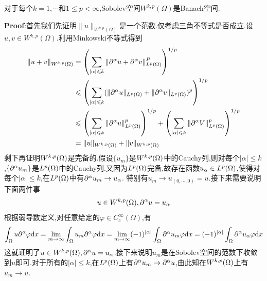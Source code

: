 \begin{tcolorbox}[colback=KuangNei,colframe=BianKuang,title=\textbf{Sobolev空间的完备性},sharpish corners]
   对于每个$k=1,\cdots$和$1\leqslant p< \infty$,Sobolev空间$W^{k,p}(\Omega)$是Banach空间.\par
\end{tcolorbox}
\textbf{Proof}:首先我们先证明$\|u\|_{W^{k,p}(\Omega)}$是一个范数.仅考虑三角不等式是否成立.设$u,v\in W^{k,p}(\Omega)$.利用Minkowski不等式得到
$$
\begin{aligned}
    \|u+v\|_{W^{k,p}(\Omega)} &= \left(\sum_{|\alpha|\leqslant k}\|\partial ^{\alpha} u+\partial ^{\alpha} v\|_{L^{p}(\Omega)}^P\right)^{1/p}\\
                              &\leqslant \left(\sum_{|\alpha|\leqslant k}(\|\partial ^{\alpha} u\|_{L^{p}(\Omega)}+\|\partial ^{\alpha} v\|_{L^{p}(\Omega)})^p\right)^{1/p}\\
                              &\leqslant \left(\sum_{|\alpha|\leqslant k}\|\partial ^{\alpha} u\|_{L^{p}(\Omega)}^p\right)^{1/p}+\left(\sum_{|\alpha|\leqslant k}\|\partial ^{\alpha} V\|_{L^{p}(\Omega)}^p\right)^{1/p}\\
                              &= \|u\|_{W^{k,p}(\Omega)}+\|v\|_{W^{k,p}(\Omega)}
\end{aligned}
$$
剩下再证明$W^{k,p}(\Omega)$是完备的.假设$\{u_m\}$是$W^{k,p}(\Omega)$中的Cauchy列,则对每个$|\alpha|\leqslant k$,$\{\partial ^{\alpha} u_m\}$是$L^p(\Omega)$中的Cauchy列.又因为$L^p(\Omega)$完备,故存在函数$u_{\alpha}\in L^p(\Omega)$,使得对每个$|\alpha|\leqslant k$,在$L^p(\Omega)$中有$\partial ^{\alpha} u_m\to u_{\alpha}$.
特别有$u_m\to u_{(0,\cdots,0)}=u$.接下来需要说明下面两件事
$$
u\in W^{k,p}(\Omega),\partial ^{\alpha} u=u_{\alpha}
$$
根据弱导数定义,对任意给定的$\varphi\in C^{\infty}_{c}(\Omega)$,有
$$
\int_{\Omega}u\partial ^{\alpha} \varphi\mathrm{d} x=\lim_{m\to\infty}\int_{\Omega}u_m\partial ^{\alpha} \varphi\mathrm{d} x=\lim_{m\to\infty}(-1)^{|\alpha|}\int_{\Omega}\partial ^{\alpha} u_m\varphi\mathrm{d} x=(-1)^{|\alpha|}\int_{\Omega}\partial ^{\alpha} u_{\alpha}\varphi\mathrm{d} x
$$
这就证明了$u\in W^{k,p}(\Omega),\partial ^{\alpha} u=u_{\alpha}$.接下来说明$u_m$是在Sobolev空间的范数下收敛到$u$即可.对于所有的$|\alpha|\leqslant k$,在$L^p(\Omega)$上有$\partial ^{\alpha} u_m\to \partial ^{\alpha} u$,由此知在$W^{k,p}(\Omega)$上有$u_m\to u$.\par
